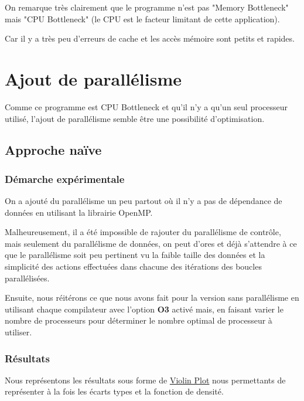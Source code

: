 \documentclass[
 aip,
 jmp,
 amsmath,amssymb,
 reprint
]{revtex4-1}
\begin{document}
On remarque très clairement que le programme n'est pas "Memory Bottleneck" mais "CPU Bottleneck" (le CPU est le facteur limitant de cette application).\par
Car il y a très peu d'erreurs de cache et les accès mémoire sont petits et rapides.

\section{Ajout de parallélisme}

Comme ce programme est CPU Bottleneck et qu'il n'y a qu'un seul processeur utilisé, l'ajout de parallélisme semble être une possibilité d'optimisation.

\subsection{Approche naïve}

\subsubsection{Démarche expérimentale}

On a ajouté du parallélisme un peu partout où il n'y a pas de dépendance de données en utilisant la librairie OpenMP.\par
Malheureusement, il a été impossible de rajouter du parallélisme de contrôle, mais seulement du parallélisme de données, on peut d'ores et déjà s'attendre à ce que le parallélisme soit peu pertinent vu la faible taille des données et la simplicité des actions effectuées dans chacune des itérations des boucles parallélisées.\par
Ensuite, nous réitérons ce que nous avons fait pour la version sans parallélisme en utilisant chaque compilateur avec l'option \textbf{O3} activé mais, en faisant varier le nombre de processeurs pour déterminer le nombre optimal de processeur à utiliser.

\subsubsection{Résultats}

Nous représentons les résultats sous forme de \href{https://en.wikipedia.org/wiki/Violin_plot}{Violin Plot} nous permettants de représenter à la fois les écarts types et la fonction de densité.
\end{document}
